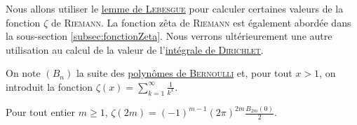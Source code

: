 %
%


\bigskip

Nous allons utiliser le \hyperref[lemmeLebesgue]{lemme de \textsc{Lebesgue}} pour calculer certaines valeurs de la fonction $\zeta$ de \textsc{Riemann}. La fonction zêta de \textsc{Riemann} est également abordée dans la sous-section \ref{subsec:fonctionZeta}. Nous verrons ultérieurement une autre utilisation au calcul de la valeur de l'\hyperref[sec:intDirichlet]{intégrale de \textsc{Dirichlet}}.

On note $(B_n)$ la suite des \hyperref[sec:polynomes_de_bernoulli]{polynômes de \textsc{Bernoulli}} et, pour tout $x > 1$, on introduit la fonction $\zeta(x) = \sum\limits_{k=1}^{\infty} \frac{1}{k^x}$.

\begin{theo}
Pour tout entier $m \geqslant 1$, $\zeta(2m) = (-1)^{m-1} (2 \pi)^{2m} \frac{B_{2m}(0)}{2}$.
\end{theo}

